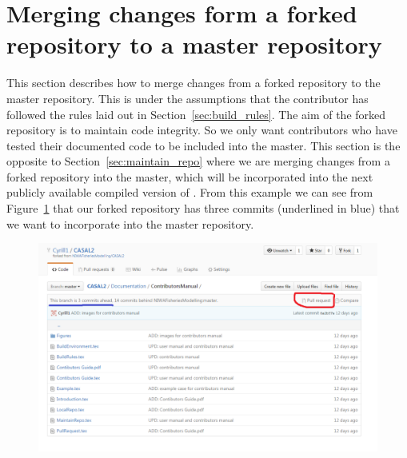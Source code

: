 \section{Merging changes form a forked repository to a master repository\label{sec:pull_requests}}

This section describes how to merge changes from a forked repository to the master repository. This is under the assumptions that the contributor has followed the rules laid out in Section~\ref{sec:build_rules}. The aim of the forked repository is to maintain code integrity. So we only want contributors who have tested their documented code to be included into the master. This section is the opposite to Section~\ref{sec:maintain_repo} where we are merging changes from a forked repository into the master, which will be incorporated into the next publicly available compiled version of \CNAME. From this example we can see from Figure~\ref{fig:fork_merge} that our forked repository has three commits (underlined in blue) that we want to incorporate into the master repository.

\begin{figure}[!ht]
	\includegraphics[scale=0.6]{Figures/Pull_request0.png}
	\caption{}\label{fig:fork_merge}
\end{figure}

